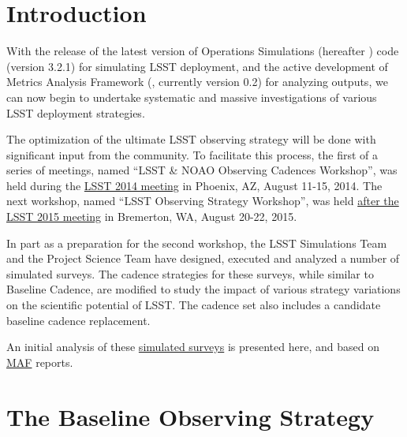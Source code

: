 
\section{Introduction}
\def\secname{cadexp:intro}\label{sec:\secname}

With the release of the latest version of Operations Simulations
(hereafter \OpSim) code (version 3.2.1)  for simulating LSST
deployment, and the active development of Metrics Analysis Framework
(\MAF,  currently version 0.2) for analyzing \OpSim outputs, we can
now begin to undertake systematic and  massive investigations of
various LSST deployment strategies.

The optimization of the ultimate LSST observing strategy will be done
with significant input from  the community. To facilitate this
process, the first of a series of meetings, named ``LSST \& NOAO
Observing Cadences Workshop'', was held during the
\href{https://project.lsst.org/meetings/ocw}{LSST 2014 meeting} in
Phoenix, AZ, August 11-15, 2014. The next workshop, named ``LSST
Observing Strategy Workshop'',  was held
\href{http://lsstsciencecollaborations.github.io/ObservingStrategy/}{after
the LSST 2015 meeting} in Bremerton, WA, August 20-22, 2015.

In part as a preparation for the second workshop, the LSST
Simulations Team and the Project Science Team have designed, executed
and analyzed a number of simulated surveys.  The cadence strategies
for these surveys, while similar to Baseline Cadence, are modified to
study the impact of various strategy variations on the scientific
potential of LSST\@. The cadence set also includes a candidate baseline
cadence replacement.

An initial analysis of these
\href{http://ops2.lsst.org:8080}{simulated surveys} is presented here,
and based on \href{https://confluence.lsstcorp.org/display/SIM/MAF+documentation}{MAF}
reports.


\listofopsimdbs

\navigationbar


\section{The Baseline Observing Strategy}
\def\secname{cadexp:baseline}\label{sec:\secname}

